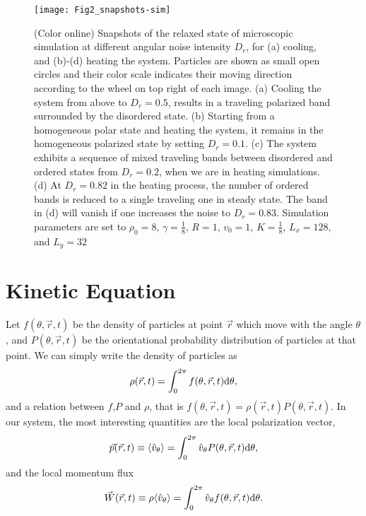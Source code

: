 \documentclass[reprint,floatfix,amsmath,amssymb,aps,pre,showkeys,showpacs,superscriptaddress]{revtex4-1}
\newcommand{\ave}[1]{\langle #1 \rangle}
\newcommand{\p}{p}
\newcommand{\vp}{\vec{\p}}
\newcommand{\w}{W}
\newcommand{\vw}{\vec{\w}}
\newcommand{\dd}{{\rm d}}
\begin{document}
\begin{figure}
	\centering
	\texttt{[image: Fig2\_snapshots-sim]}
	\caption{(Color online) Snapshots of the relaxed state of microscopic simulation at different angular noise intensity $D_r$, for (a) cooling, and (b)-(d) heating the system. Particles are shown as small open circles and their color scale indicates their moving direction according to the wheel on top right of each image. (a) Cooling the system from above to $D_r=0.5$, results in a traveling polarized band surrounded by the disordered state. (b) Starting from a homogeneous polar state and heating the system, it remains in the homogeneous polarized state by setting $D_r=0.1$. (c) The system exhibits a sequence of mixed traveling bands between disordered and ordered states from $D_r=0.2$, when we are in heating simulations. (d) At $D_r=0.82$ in the heating process, the number of ordered bands is reduced to a single traveling one in steady state. The band in (d) will vanish if one increases the noise to $D_r=0.83$. Simulation parameters are set to $\rho_0=8$, $\gamma=\tfrac{1}{8}$, $R=1$, $v_0=1$, $K=\tfrac{1}{8}$, $L_x=128$, and $L_y=32$}
\label{fig:snapshots-sim}
\end{figure}

\section{Kinetic Equation}
\label{section:kinetic-theory}

Let $f(\theta,\vec{r},t)$ be the density of particles at point $\vec{r}$ which move with the angle $\theta$, and $P(\theta,\vec{r},t)$ be the orientational probability distribution of particles at that point. We can simply write the density of particles as
\begin{equation}
\rho(\vec{r},t) = \int_{0}^{2\pi} f(\theta,\vec{r},t) \dd \theta,
\end{equation}
and a relation between $f$,$P$ and $\rho$, that is $f(\theta,\vec{r},t) = \rho(\vec{r},t) P(\theta,\vec{r},t)$. In our system, the most interesting quantities are the local polarization vector,
\begin{equation}
\vp(\vec{r},t) \equiv \ave{\hat{v}_{\theta}} = \int_{0}^{2\pi} \hat{v}_{\theta} P(\theta,\vec{r},t) \dd \theta,
\label{eq:local-polarization}
\end{equation}
and the local momentum flux
\begin{equation}
\vw(\vec{r},t) \equiv \rho \ave{\hat{v}_{\theta}} = \int_{0}^{2\pi} \hat{v}_{\theta} f(\theta,\vec{r},t) \dd \theta.
\label{eq:local-w}
\end{equation}
\end{document}
